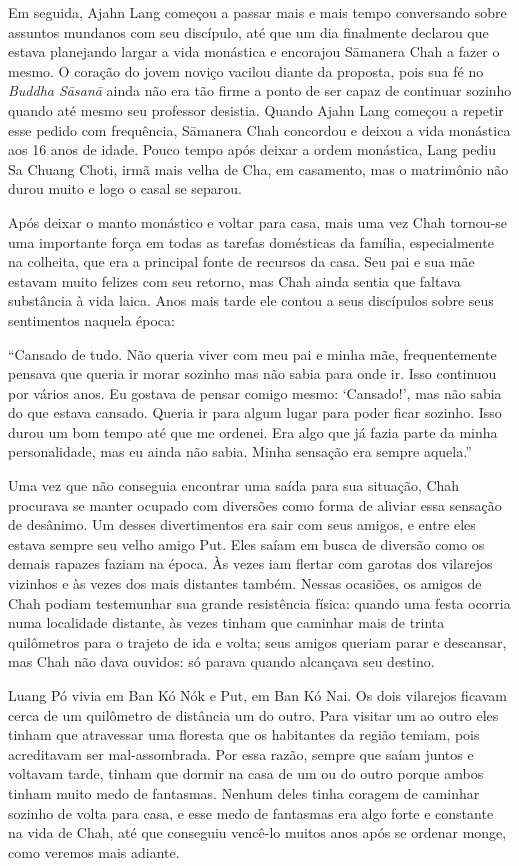 Em seguida, Ajahn Lang começou a passar mais e mais tempo conversando
sobre assuntos mundanos com seu discípulo, até que um dia finalmente
declarou que estava planejando largar a vida monástica e encorajou
Sāmanera Chah a fazer o mesmo. O coração do jovem noviço vacilou diante
da proposta, pois sua fé no \emph{Buddha Sāsanā} ainda não era tão firme
a ponto de ser capaz de continuar sozinho quando até mesmo seu professor
desistia. Quando Ajahn Lang começou a repetir esse pedido com
frequência, Sāmanera Chah concordou e deixou a vida monástica aos 16
anos de idade. Pouco tempo após deixar a ordem monástica, Lang pediu Sa
Chuang Choti, irmã mais velha de Cha, em casamento, mas o matrimônio não
durou muito e logo o casal se separou.

Após deixar o manto monástico e voltar para casa, mais uma vez Chah
tornou-se uma importante força em todas as tarefas domésticas da
família, especialmente na colheita, que era a principal fonte de
recursos da casa. Seu pai e sua mãe estavam muito felizes com seu
retorno, mas Chah ainda sentia que faltava substância à vida laica. Anos
mais tarde ele contou a seus discípulos sobre seus sentimentos naquela
época:

``Cansado de tudo. Não queria viver com meu pai e minha mãe,
frequentemente pensava que queria ir morar sozinho mas não sabia para
onde ir. Isso continuou por vários anos. Eu gostava de pensar comigo
mesmo: `Cansado!', mas não sabia do que estava cansado. Queria ir para
algum lugar para poder ficar sozinho. Isso durou um bom tempo até que me
ordenei. Era algo que já fazia parte da minha personalidade, mas eu
ainda não sabia. Minha sensação era sempre aquela.''

Uma vez que não conseguia encontrar uma saída para sua situação, Chah
procurava se manter ocupado com diversões como forma de aliviar essa
sensação de desânimo. Um desses divertimentos era sair com seus amigos,
e entre eles estava sempre seu velho amigo Put. Eles saíam em busca de
diversão como os demais rapazes faziam na época. Às vezes iam flertar
com garotas dos vilarejos vizinhos e às vezes dos mais distantes também.
Nessas ocasiões, os amigos de Chah podiam testemunhar sua grande
resistência física: quando uma festa ocorria numa localidade distante,
às vezes tinham que caminhar mais de trinta quilômetros para o trajeto
de ida e volta; seus amigos queriam parar e descansar, mas Chah não dava
ouvidos: só parava quando alcançava seu destino.

Luang Pó vivia em Ban Kó Nók e Put, em Ban Kó Nai. Os dois vilarejos
ficavam cerca de um quilômetro de distância um do outro. Para visitar um
ao outro eles tinham que atravessar uma floresta que os habitantes da
região temiam, pois acreditavam ser mal-assombrada. Por essa razão,
sempre que saíam juntos e voltavam tarde, tinham que dormir na casa de
um ou do outro porque ambos tinham muito medo de fantasmas. Nenhum deles
tinha coragem de caminhar sozinho de volta para casa, e esse medo de
fantasmas era algo forte e constante na vida de Chah, até que conseguiu
vencê-lo muitos anos após se ordenar monge, como veremos mais adiante.

